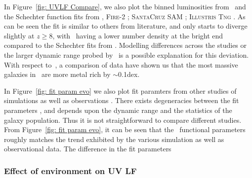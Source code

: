 In Figure~\ref{fig: UVLF Compare}, we also plot the binned luminosities from \bluetides\,\citep{Wilkins2017} and the Schechter function fits from \cite{Mason2015}, \textsc{Fire-2} \citep{ma_dust_2019}; \textsc{SantaCruz} SAM \citep{yung_semi-analytic_2019}; \textsc{Illustris Tng} \protect\citep[Model-C from][]{Vogelsberger2020}. As can be seen the fit is similar to others from literature, and only starts to diverge slightly at $z\ge8$, with \flares\, having a lower number density at the bright end compared to the Schechter fits from \cite{Mason2015,ma_dust_2019}. Modelling differences across the studies or the larger dynamic range probed by \flares\, is a possible explanation for this deviation. With respect to \bluetides\,, a comparison of data have shown us that the most massive galaxies in \flares\, are more metal rich by $\sim$0.1dex. 

In Figure~\ref{fig: fit param evo} we also plot fit paramters from other studies of simulations \citep{Mason2015,Wilkins2017,yung_semi-analytic_2019,Vogelsberger2020} as well as observations \citep{Finkelstein2015,Bowler2015,Bowler2020}.  There exists degeneracies between the fit parameters \citep[\eg][]{Robertson2010a}, and depends upon the dynamic range and the statistics of the galaxy population. Thus it is not straightforward to compare different studies. From Figure~\ref{fig: fit param evo}, it can be seen that the \flares\, functional parameters roughly matches the trend exhibited by the various simulation as well as observational data. The difference in the fit parameters 


\subsubsection{Effect of environment on UV LF}\label{sec: PhotProp.UVLF.Env}

